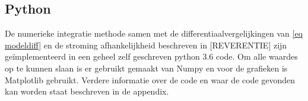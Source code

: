 
\subsection{Python}
De numerieke integratie methode samen met de differentiaalvergelijkingen van \ref{eq modeldiff} en de stroming afhankelijkheid beschreven in [REVERENTIE] zijn geïmplementeerd in een geheel zelf geschreven python 3.6 code. Om alle waardes op te kunnen slaan is er gebruikt gemaakt van Numpy en voor de grafieken is Matplotlib gebruikt. Verdere informatie over de code en waar de code gevonden kan worden staat beschreven in de appendix.